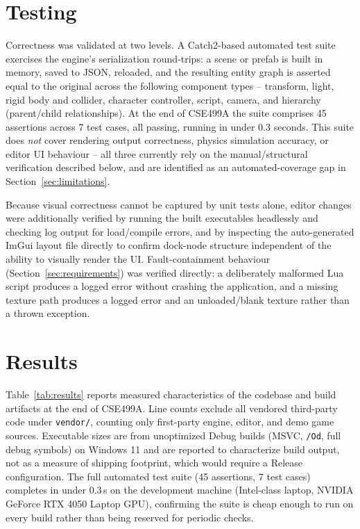 \documentclass[conference]{IEEEtran}
\begin{document}
\section{Testing}
\label{sec:testing}

Correctness was validated at two levels. A Catch2-based automated test
suite exercises the engine's serialization round-trips: a scene or prefab
is built in memory, saved to JSON, reloaded, and the resulting entity
graph is asserted equal to the original across the following component
types -- transform, light, rigid body and collider, character
controller, script, camera, and hierarchy (parent/child relationships).
At the end of CSE499A the suite comprises 45 assertions across 7 test
cases, all passing, running in under 0.3 seconds. This suite does
\emph{not} cover rendering output correctness, physics simulation
accuracy, or editor UI behaviour -- all three currently rely on the
manual/structural verification described below, and are identified as
an automated-coverage gap in Section~\ref{sec:limitations}.

Because visual correctness cannot be captured by unit tests alone,
editor changes were additionally verified by running the built
executables headlessly and checking log output for load/compile errors,
and by inspecting the auto-generated ImGui layout file directly to
confirm dock-node structure independent of the ability to visually
render the UI. Fault-containment behaviour (Section~\ref{sec:requirements})
was verified directly: a deliberately malformed Lua script produces a
logged error without crashing the application, and a missing texture
path produces a logged error and an unloaded/blank texture rather than a
thrown exception.

\section{Results}
\label{sec:results}

Table~\ref{tab:results} reports measured characteristics of the codebase
and build artifacts at the end of CSE499A. Line counts exclude all
vendored third-party code under \texttt{vendor/}, counting only
first-party engine, editor, and demo game sources. Executable sizes are
from unoptimized Debug builds (MSVC, \texttt{/Od}, full debug symbols)
on Windows 11 and are reported to characterize build output, not as a
measure of shipping footprint, which would require a Release
configuration. The full automated test suite (45 assertions, 7 test
cases) completes in under 0.3\,s on the development machine (Intel-class
laptop, NVIDIA GeForce RTX 4050 Laptop GPU), confirming the suite is
cheap enough to run on every build rather than being reserved for
periodic checks.
\end{document}
